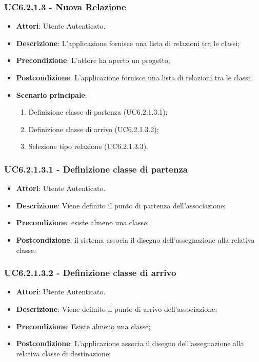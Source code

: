 \subsubsection{UC6.2.1.3 - Nuova Relazione} 
\label{sssec:UC6.2.1.3} 
\begin{itemize} 
\item \textbf{Attori}: Utente Autenticato.
\item \textbf{Descrizione}: L'applicazione fornisce una lista di relazioni tra le classi;
\item \textbf{Precondizione}: L'attore ha aperto un progetto;
\item \textbf{Postcondizione}: L'applicazione fornisce una lista di relazioni tra le classi;
\item \textbf{Scenario principale}: \begin{enumerate}\item Definizione classe di partenza (UC6.2.1.3.1);\item Definizione classe di arrivo (UC6.2.1.3.2);\item Selezione tipo relazione (UC6.2.1.3.3). 
 \end{enumerate}
\end{itemize} 
\subsubsection{UC6.2.1.3.1 - Definizione classe di partenza} 
\label{sssec:UC6.2.1.3.1} 
\begin{itemize} 
\item \textbf{Attori}: Utente Autenticato.
\item \textbf{Descrizione}: Viene definito il punto di partenza dell'associazione;
\item \textbf{Precondizione}: esiste almeno una classe;
\item \textbf{Postcondizione}: il sistema associa il disegno dell'assegnazione alla relativa classe;
\end{itemize} 
\subsubsection{UC6.2.1.3.2 - Definizione classe di arrivo} 
\label{sssec:UC6.2.1.3.2} 
\begin{itemize} 
\item \textbf{Attori}: Utente Autenticato.
\item \textbf{Descrizione}: Viene definito il punto di arrivo dell'associazione;
\item \textbf{Precondizione}: Esiste almeno una classe;
\item \textbf{Postcondizione}: L'applicazione associa il disegno dell'assegnazione alla relativa classe di destinazione;
\end{itemize} 
